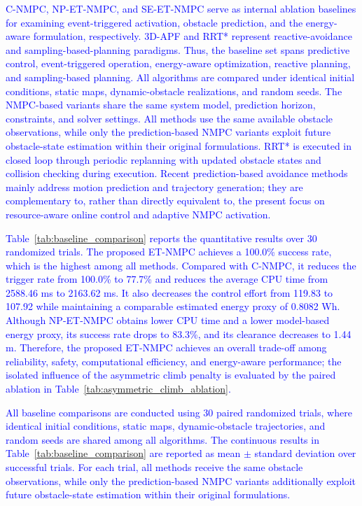 \documentclass[lettersize,journal]{IEEEtran}
\begin{document}
\textcolor{blue}{C-NMPC, NP-ET-NMPC, and SE-ET-NMPC serve as internal ablation baselines for examining event-triggered activation, obstacle prediction, and the energy-aware formulation, respectively. 3D-APF and RRT* represent reactive-avoidance and sampling-based-planning paradigms. Thus, the baseline set spans predictive control, event-triggered operation, energy-aware optimization, reactive planning, and sampling-based planning. All algorithms are compared under identical initial conditions, static maps, dynamic-obstacle realizations, and random seeds. The NMPC-based variants share the same system model, prediction horizon, constraints, and solver settings. All methods use the same available obstacle observations, while only the prediction-based NMPC variants exploit future obstacle-state estimation within their original formulations. RRT* is executed in closed loop through periodic replanning with updated obstacle states and collision checking during execution. Recent prediction-based avoidance methods mainly address motion prediction and trajectory generation; they are complementary to, rather than directly equivalent to, the present focus on resource-aware online control and adaptive NMPC activation.}

\textcolor{blue}{Table~\ref{tab:baseline_comparison} reports the quantitative results over 30 randomized trials. The proposed ET-NMPC achieves a 100.0\% success rate, which is the highest among all methods. Compared with C-NMPC, it reduces the trigger rate from 100.0\% to 77.7\% and reduces the average CPU time from 2588.46 ms to 2163.62 ms. It also decreases the control effort from 119.83 to 107.92 while maintaining a comparable estimated energy proxy of 0.8082 Wh. Although NP-ET-NMPC obtains lower CPU time and a lower model-based energy proxy, its success rate drops to 83.3\%, and its clearance decreases to 1.44 m. Therefore, the proposed ET-NMPC achieves an overall trade-off among reliability, safety, computational efficiency, and energy-aware performance; the isolated influence of the asymmetric climb penalty is evaluated by the paired ablation in Table~\ref{tab:asymmetric_climb_ablation}.}

\textcolor{blue}{All baseline comparisons are conducted using 30 paired randomized trials, where identical initial conditions, static maps, dynamic-obstacle trajectories, and random seeds are shared among all algorithms. The continuous results in Table~\ref{tab:baseline_comparison} are reported as mean $\pm$ standard deviation over successful trials. For each trial, all methods receive the same obstacle observations, while only the prediction-based NMPC variants additionally exploit future obstacle-state estimation within their original formulations.}
\end{document}
